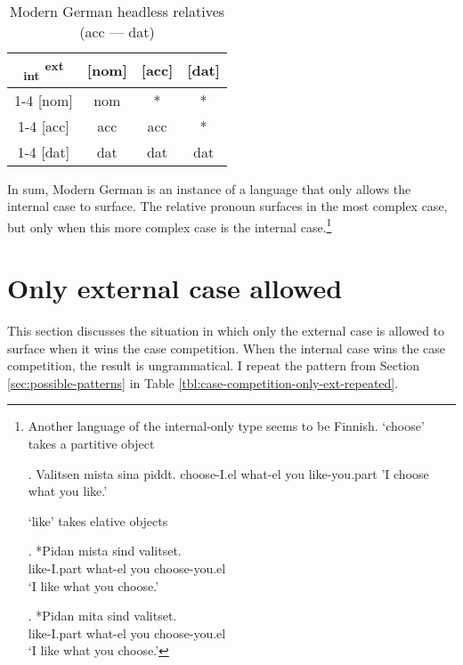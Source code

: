 \begin{table}[ht]
  \center
  \caption{Modern German headless relatives (\ac{acc} --- \ac{dat})}
  \begin{tabular}{c|c|c|c}
    \toprule
    \textsubscript{\ac{int}} \textsuperscript{\ac{ext}}
           & [\ac{nom}]
           & [\ac{acc}]
           & [\ac{dat}]
           \\ \cmidrule{1-4}
       [\ac{nom}]
           & \ac{nom}
           & *
           & *
           \\ \cmidrule{1-4}
       [\ac{acc}]
           & \ac{acc}
           & \ac{acc}
           & \cellcolor{DG}*
           \\ \cmidrule{1-4}
       [\ac{dat}]
           & \ac{dat}
           & \cellcolor{LG}\ac{dat}
           & \ac{dat}
           \\
     \bottomrule
  \end{tabular}
    \label{tbl:case-competition-mg-acc-dat}
\end{table}

In sum, Modern German is an instance of a language that only allows the internal case to surface. The relative pronoun surfaces in the most complex case, but only when this more complex case is the internal case.\footnote{Another language of the internal-only type seems to be Finnish.
 `choose' takes a partitive object

\ex. Valitsen mista sina piddt.
choose-I.el what-el you like-you.part
'I choose what you like.'

 `like' takes elative objects

\exg. *Pidan mista sind valitset.\\
like-I.part what-el you choose-you.el\\
`I like what you choose.'

\exg. *Pidan mita sind valitset.\\
like-I.part what-el you choose-you.el\\
`I like what you choose.'

\phantom{x}
}



\section{Only external case allowed}\label{sec:pattern-iii}

This section discusses the situation in which only the external case is allowed to surface when it wins the case competition. When the internal case wins the case competition, the result is ungrammatical. I repeat the pattern from Section \ref{sec:possible-patterns} in Table \ref{tbl:case-competition-only-ext-repeated}.

